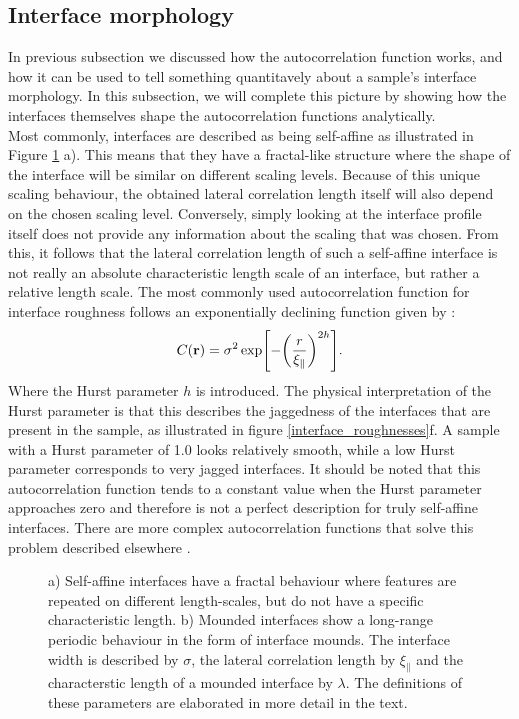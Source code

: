 \subsection{Interface morphology}\label{interface_features}
In previous subsection we discussed how the autocorrelation function works, and how it can be used to tell something quantitavely about a sample's interface morphology. In this subsection, we will complete this picture by showing how the interfaces themselves shape the autocorrelation functions analytically. \\
Most commonly, interfaces are described as being self-affine as illustrated in Figure \ref{interface_types} a). This means that they have a fractal-like structure where the shape of the interface will be similar on different scaling levels. Because of this unique scaling behaviour, the obtained lateral correlation length itself will also depend on the chosen scaling level. Conversely, simply looking at the interface profile itself does not provide any information about the scaling that was chosen. From this, it follows that the lateral correlation length of such a self-affine interface is not really an absolute characteristic length scale of an interface, but rather a relative length scale. The most commonly used autocorrelation function for interface roughness follows an exponentially declining function given by \cite{thesis_ILL}: 
\begin{equation}\label{self_affine_corr}
	C(\vb{r}) = \sigma^2 \exp[-\qty(\frac{r}{\xi_{\parallel}})^{2h}].
\end{equation}
Where the Hurst parameter $h$ is introduced. The physical interpretation of the Hurst parameter is that this describes the jaggedness of the interfaces that are present in the sample, as illustrated in figure \ref{interface_roughnesses}f. A sample with a Hurst parameter of 1.0 looks relatively smooth, while a low Hurst parameter corresponds to very jagged interfaces. It should be noted that this autocorrelation function tends to a constant value when the Hurst parameter approaches zero and therefore is not a perfect description for truly self-affine interfaces. There are more complex autocorrelation functions that solve this problem described elsewhere \cite{gisaxs_multilayers}.
\begin{figure}
	\centering
	\def\svgwidth{\textwidth}
	
	\caption{a) Self-affine interfaces have a fractal behaviour where features are repeated on different length-scales, but do not have a specific characteristic length. b) Mounded interfaces show a long-range periodic behaviour in the form of interface mounds. The interface width is described by $\sigma$, the lateral correlation length by $\xi_{\parallel}$ and the characterstic length of a mounded interface by $\lambda$. The definitions of these parameters are elaborated in more detail in the text.}
	\label{interface_types}
\end{figure}

